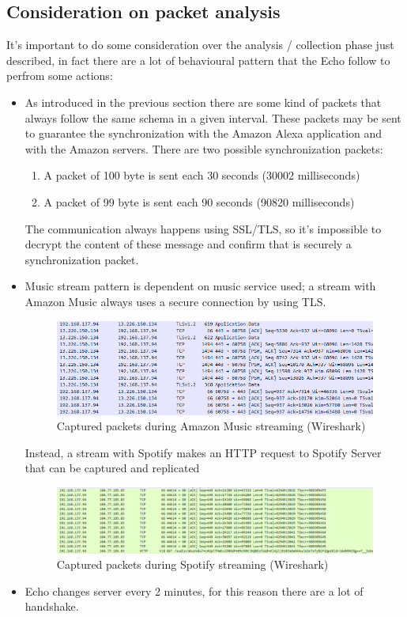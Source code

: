 \documentclass[sigconf]{acmart}
\begin{document}
    \subsection[Consideration on packet]{Consideration on packet analysis}
    It's important to do some consideration over the analysis / collection phase just described, in fact there are a lot of behavioural pattern that the Echo follow to perfrom some actions:
    \begin{itemize}
        \item As introduced in the previous section there are some kind of packets that always follow the same schema in a given interval.
        These packets may be sent to guarantee the synchronization with the Amazon Alexa application and with the Amazon servers.
        There are two possible synchronization packets:
        \begin{enumerate}
            \item A packet of 100 byte is sent each 30 seconds (30002 milliseconds)
            \item A packet of 99 byte is sent each 90 seconds (90820 milliseconds)
        \end{enumerate}
        The communication always happens using SSL/TLS, so it's impossible to decrypt the content of these message and confirm that is securely a synchronization packet.
        \item Music stream pattern is dependent on music service used; a stream with Amazon Music always uses a secure connection by using TLS.
        \begin{figure}[h!]
            \centering
            \includegraphics[width=0.8\columnwidth]{img/capture_amazon_music.png}
            \caption{Captured packets during Amazon Music streaming (Wireshark)}
            \label{fig:capture_amazon_music}
        \end{figure}

        Instead, a stream with Spotify makes an HTTP request to Spotify Server that can be captured and replicated
        \begin{figure}[h!]
            \centering
            \includegraphics[width=0.8\columnwidth]{img/capture_spotify.png}
            \caption{Captured packets during Spotify streaming (Wireshark)}
            \label{fig:capture_spotify}
        \end{figure}
        \item Echo changes server every 2 minutes, for this reason there are a lot of handshake.
    \end{itemize}
\end{document}
